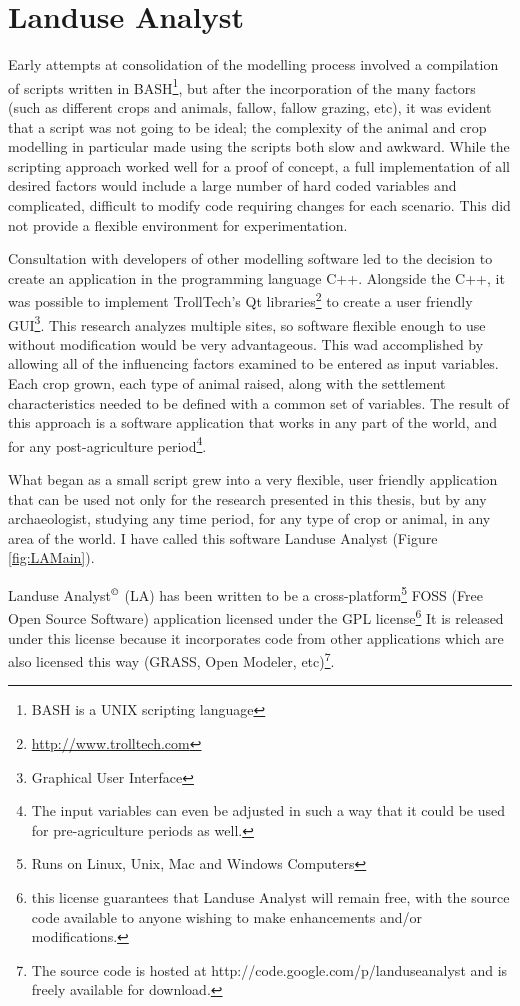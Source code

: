 \section{Landuse Analyst}
	\label{LanduseAnalyst}
Early attempts at consolidation of the modelling process involved a compilation of scripts written in BASH\footnote{BASH is a UNIX scripting language}, but after the incorporation of the many factors (such as different crops and animals, fallow, fallow grazing, etc), it was evident that a script was not going to be ideal; the complexity of the animal and crop modelling in particular made using the scripts both slow and awkward. While the scripting approach worked well for a proof of concept, a full implementation of all desired factors would include a large number of hard coded variables and complicated, difficult to modify code requiring changes for each scenario.  This did not provide a flexible environment for experimentation.  

Consultation with developers of other modelling software led to the decision to create an application in the programming language C++.  Alongside the C++, it was possible to implement TrollTech's Qt libraries\footnote{\url{http://www.trolltech.com}} to create a user friendly GUI\footnote{Graphical User Interface}.  This research analyzes multiple sites, so software flexible enough to use without modification would be very advantageous. This wad accomplished by allowing all of the influencing factors examined to be entered as input variables. Each crop grown, each type of animal raised, along with the settlement characteristics needed to be defined with a common set of variables. The result of this approach is a software application that works in any part of the world, and for any post-agriculture period\footnote{The input variables can even be adjusted in such a way that it could be used for pre-agriculture periods as well.}.

What began as a small script grew into a very flexible, user friendly application that can be used not only for the research presented in this thesis, but by any archaeologist, studying any time period, for any type of crop or animal, in any area of the world. I have called this software Landuse Analyst (Figure \ref{fig:LAMain}).

Landuse Analyst$^\copyright$ (LA) has been written to be a cross-platform\footnote{Runs on Linux, Unix, Mac and Windows Computers} FOSS (Free Open Source Software) application licensed under the GPL license\footnote{this license guarantees that Landuse Analyst will remain free, with the source code available to anyone wishing to make enhancements and/or modifications.} It is released under this license because it incorporates code from other applications which are also licensed this way (GRASS, Open Modeler, etc)\footnote{The source code is hosted at http://code.google.com/p/landuseanalyst and is freely available for download.}.

